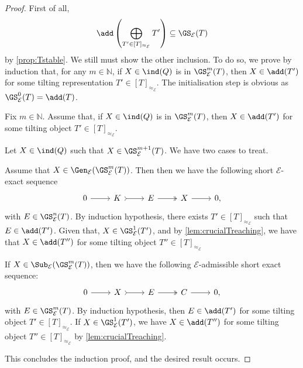 \begin{proof}
First of all, \[\add\left(\bigoplus_{T' \in [T]_{\approx_{\mathcal{E}}}} T' \right) \subseteq  \GS_{\mathcal{E}}(T)\] by \cref{prop:Tstable}. We still must show the other inclusion. To do so, we prove by induction that, for any $m \in \mathbb{N}$, if $X \in \ind(Q)$ is in $\GS_{\mathcal{E}}^m(T)$, then $X \in \add(T')$ for some tilting representation $T' \in [T]_{\approx_{\mathcal{E}}}$. The initialisation step is obvious as $\GS^0_{\mathcal{E}}(T) = \add(T)$. 

Fix $m \in \mathbb{N}$. Assume that, if $X \in \ind(Q)$ is in $\GS^m_{\mathcal{E}}(T)$, then $X \in \add(T')$ for some tilting object $T' \in [T]_{\approx_{\mathcal{E}}}$.

Let $X \in \ind(Q)$ such that $X \in \GS^{m+1}_{\mathcal{E}}(T)$. We have two cases to treat. 

Assume that $X \in \Gen_{\mathcal{E}}(\GS^{m}_{\mathcal{E}}(T))$. Then then we have the following short $\mathcal{E}$-exact sequence
\[\begin{tikzcd}
	0 & K & E  & X &  0,
	\arrow[from=1-1, to=1-2]
	\arrow[tail, from=1-2, to=1-3]
	\arrow[two heads,from=1-3, to=1-4]
	\arrow[from=1-4, to=1-5]
\end{tikzcd} \] with $E \in \GS^{n}_{\mathcal{E}}(T)$. By induction hypothesis, there exists $T' \in [T]_{\approx_\mathcal{E}}$ such that $E \in \add(T')$. 
Given that, $X \in \GS^{1}_\mathcal{E}(T')$, and by \cref{lem:crucialTreaching}, we have that $X \in \add(T'')$ for some tilting object $T'' \in [T]_{\approx_\mathcal{E}}$ 

If $X \in \Sub_{\mathcal{E}}(\GS^{m}_{\mathcal{E}}(T))$, then we have the following $\mathcal{E}$-admissible short exact sequence:
\[\begin{tikzcd}
	0 & X & E  & C &  0,
	\arrow[from=1-1, to=1-2]
	\arrow[tail, from=1-2, to=1-3]
	\arrow[two heads,from=1-3, to=1-4]
	\arrow[from=1-4, to=1-5]
\end{tikzcd} \] with $E \in \GS^{m}_\mathcal{E}(T)$. By induction hypothesis, then $E \in \add(T')$ 
for some tilting object $T' \in [T]_{\approx_\mathcal{E}}$. If $X \in \GS^{1}_\mathcal{E}(T')$, we have $X \in \add(T'')$ for some tilting object $T'' \in [T]_{\approx_\mathcal{E}}$ by \cref{lem:crucialTreaching}. 

This concludes the induction proof, and the desired result occurs.
\end{proof}